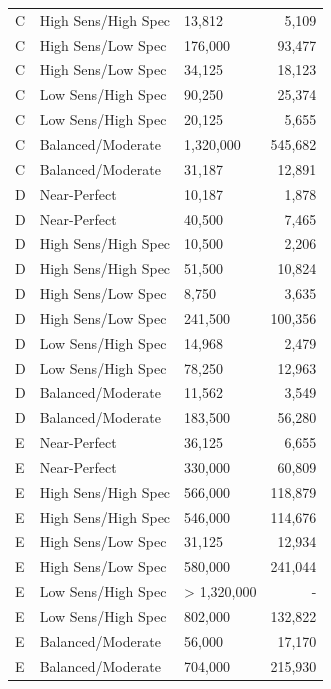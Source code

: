 \documentclass[
  letterpaper,
  DIV=11,
  numbers=noendperiod]{scrartcl}
\begin{document}
\begin{table}
{\begin{tabular*}{\linewidth}{@{\extracolsep{\fill}}lllr}
C & High Sens/High Spec & 13,812 & 5,109 \\ 
C & High Sens/Low Spec & 176,000 & 93,477 \\ 
C & High Sens/Low Spec & 34,125 & 18,123 \\ 
C & Low Sens/High Spec & 90,250 & 25,374 \\ 
C & Low Sens/High Spec & 20,125 & 5,655 \\ 
C & Balanced/Moderate & 1,320,000 & 545,682 \\ 
C & Balanced/Moderate & 31,187 & 12,891 \\ 
D & Near-Perfect & 10,187 & 1,878 \\ 
D & Near-Perfect & 40,500 & 7,465 \\ 
D & High Sens/High Spec & 10,500 & 2,206 \\ 
D & High Sens/High Spec & 51,500 & 10,824 \\ 
D & High Sens/Low Spec & 8,750 & 3,635 \\ 
D & High Sens/Low Spec & 241,500 & 100,356 \\ 
D & Low Sens/High Spec & 14,968 & 2,479 \\ 
D & Low Sens/High Spec & 78,250 & 12,963 \\ 
D & Balanced/Moderate & 11,562 & 3,549 \\ 
D & Balanced/Moderate & 183,500 & 56,280 \\ 
E & Near-Perfect & 36,125 & 6,655 \\ 
E & Near-Perfect & 330,000 & 60,809 \\ 
E & High Sens/High Spec & 566,000 & 118,879 \\ 
E & High Sens/High Spec & 546,000 & 114,676 \\ 
E & High Sens/Low Spec & 31,125 & 12,934 \\ 
E & High Sens/Low Spec & 580,000 & 241,044 \\ 
E & Low Sens/High Spec & > 1,320,000 & - \\ 
E & Low Sens/High Spec & 802,000 & 132,822 \\ 
E & Balanced/Moderate & 56,000 & 17,170 \\ 
E & Balanced/Moderate & 704,000 & 215,930 \\ 
\bottomrule
\end{tabular*}

}
\end{table}
\end{document}
